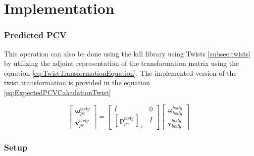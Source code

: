 \documentclass[report.tex]{subfiles}
\begin{document}
    \chapter{Implementation} \label{chap:implementation}
 
    
    \subsection {Predicted PCV}
    
    This operation can also be done using the \gls{kdl} library using Twists \ref{subsec:twists} by utilizing the adjoint representation of the transformation matrix using the equation \ref{eq:TwistTransformationEquation}. The implemented version of the twist transformation is provided in the equation \ref{eq:ExpectedPCVCalculationTwist}
    
                
        \begin{equation}
            \begin{bmatrix}
            \boldsymbol{\omega}_{pc}^{body} \\
            \mathbf{v}_{pc}^{body}
            \end{bmatrix}
            =
            \begin{bmatrix}
            I & 0 \\
            \left[\,\mathbf{p}_{pc}^{body}\,\right]_\times & I
            \end{bmatrix}
            \begin{bmatrix}
            \boldsymbol{\omega}_{body}^{body} \\
            \mathbf{v}_{body}^{body}
            \end{bmatrix}
            \label{eq:ExpectedPCVCalculationTwist}            
        \end{equation}

    
        \subsection{Setup}
        
\end{document}
